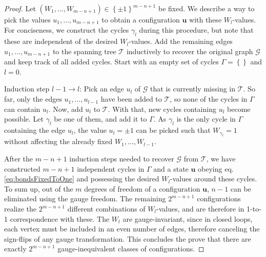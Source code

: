 \documentclass[%
fontsize=12pt, %
twoside=off %
]{scrbook}
\begin{document}
\begin{proof}
Let $\left(W_1,\dots,W_{m-n+1}\right)\in\left\{\pm 1\right\}^{m-n+1}$ be fixed. We describe a way to pick the values $u_1,\dots,u_{m-n+1}$ to obtain a configuration $\bm u$ with these $W_l$-values. For conciseness, we construct the cycles $\gamma_l$ during this procedure, but note that these are independent of the desired $W_l$-values. Add the remaining edges $u_1,\dots,u_{m-n+1}$ to the spanning tree $\mathcal{T}$ inductively to recover the original graph $\mathcal{G}$ and keep track of all added cycles. Start with an empty set of cycles $\Gamma = \left\{\right\}$ and $l=0$.

Induction step $l-1\to l$: Pick an edge $u_l$ of $\mathcal{G}$ that is currently missing in $\mathcal{T}$. So far, only the edges $u_1,\dots,u_{l-1}$ have been added to  $\mathcal{T}$, so none of the cycles in $\Gamma$ can contain $u_l$. Now, add $u_l$ to $\mathcal{T}$. With that, new cycles containing $u_l$ become possible. Let $\gamma_l$ be one of them, and add it to $\Gamma$. As $\gamma_l$ is the only cycle in $\Gamma$ containing the edge $u_l$, the value $u_l=\pm 1$ can be picked such that $W_{\gamma_l} = 1$ without affecting the already fixed $W_1,\dots,W_{l-1}$.

After the $m-n+1$ induction steps needed to recover $\mathcal{G}$ from $\mathcal{T}$, we have constructed $m-n+1$ independent cycles in $\Gamma$ and a state $\bm u$ obeying eq. \ref{eq:bondsFixedToOne} and possessing the desired $W_l$-values around these cycles. To sum up, out of the $m$ degrees of freedom of a configuration $\bm u$, $n-1$ can be eliminated using the gauge freedom. The remaining $2^{m-n+1}$ configurations realize the $2^{m-n+1}$ different combinations of $W_l$-values, and are therefore in 1-to-1 correspondence with these. The $W_l$ are gauge-invariant, since in closed loops, each vertex must be included in an even number of edges, therefore canceling the sign-flips of any gauge transformation. This concludes the prove that there are exactly $2^{m-n+1}$ gauge-inequivalent classes of configurations.


\end{proof}

\printbibliography
\end{document}

